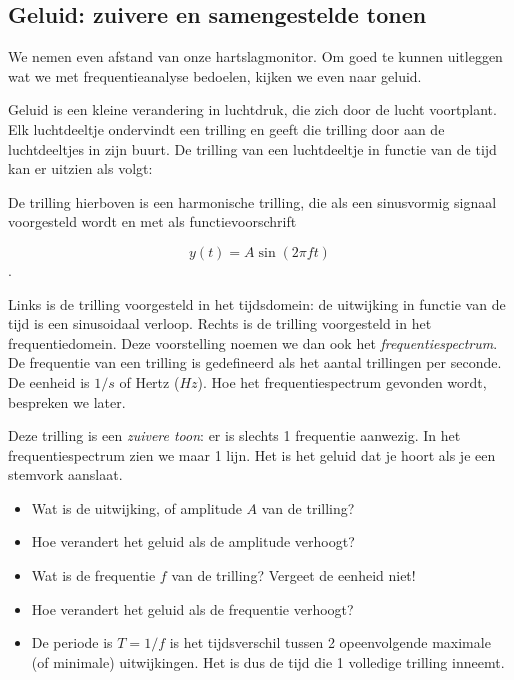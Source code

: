 \subsection{Geluid: zuivere en samengestelde tonen}

We nemen even afstand van onze hartslagmonitor. Om goed te kunnen uitleggen wat we met frequentieanalyse bedoelen, kijken we even naar geluid.

Geluid is een kleine verandering in luchtdruk, die zich door de lucht voortplant. Elk luchtdeeltje ondervindt een trilling en geeft die trilling door aan de luchtdeeltjes in zijn buurt. De trilling van een luchtdeeltje in functie van de tijd kan er uitzien als volgt:


De trilling hierboven is een harmonische trilling, die als een sinusvormig signaal voorgesteld wordt en met als functievoorschrift 

\begin{equation*}
y(t) = A \sin(2\pi f t)
\end{equation*}. 

Links is de trilling voorgesteld in het tijdsdomein: de uitwijking in functie van de tijd is een sinusoidaal verloop. Rechts is de trilling voorgesteld in het frequentiedomein. Deze voorstelling noemen we dan ook het \emph{frequentiespectrum}. De frequentie van een trilling is gedefineerd als het aantal trillingen per seconde. De eenheid is $1/s$ of Hertz ($Hz$). Hoe het frequentiespectrum gevonden wordt, bespreken we later.

Deze trilling is een \emph{zuivere toon}: er is slechts 1 frequentie aanwezig. In het frequentiespectrum zien we maar 1 lijn. Het is het geluid dat je hoort als je een stemvork aanslaat.

\begin{oef}
\begin{itemize}
	\item Wat is de uitwijking, of amplitude $A$ van de trilling? 
	\item Hoe verandert het geluid als de amplitude verhoogt?
	\item Wat is de frequentie $f$ van de trilling? Vergeet de eenheid niet!
	\item Hoe verandert het geluid als de frequentie verhoogt?
	\item De periode is $T=1/f$ is het tijdsverschil tussen 2 opeenvolgende maximale (of minimale) uitwijkingen. Het is dus de tijd die 1 volledige trilling inneemt.
\end{itemize}
\end{oef}

